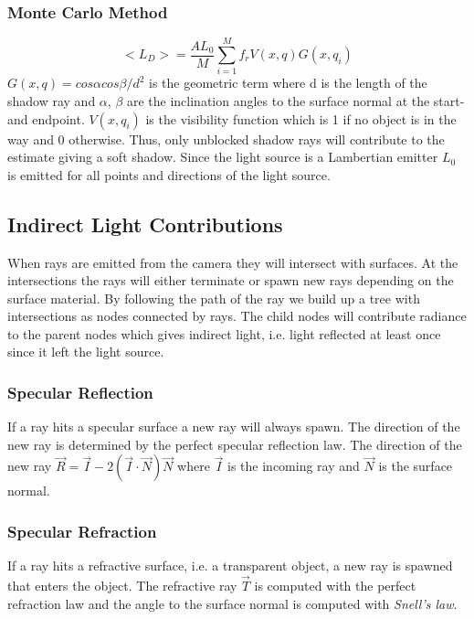 \documentclass[a4paper, twocolumn]{article}
\begin{document}
            \subsubsection{Monte Carlo Method} \label{sec:monte_carlo_method}
            \begin{equation*}
              <L_D> = \frac{AL_0}{M}\sum_{i=1}^{M}{f_r V(x, q) G(x, q_i)}
            \end{equation*}
             $G(x, q) = cos\alpha cos\beta / d^2$ is the geometric term where d is the length of the shadow ray and $\alpha$, $\beta$ are the inclination angles to the surface normal at the start- and endpoint. $V(x, q_i)$ is the visibility function which is 1 if no object is in the way and 0 otherwise. Thus, only unblocked shadow rays will contribute to the estimate giving a soft shadow. Since the light source is a Lambertian emitter $L_0$ is emitted for all points and directions of the light source.
            
            \subsection{Indirect Light Contributions} \label{sec:indirect_light_contributions}
            When rays are emitted from the camera they will intersect with surfaces. At the intersections the rays will either terminate or spawn new rays depending on the surface material. By following the path of the ray we build up a tree with intersections as nodes connected by rays. The child nodes will contribute radiance to the parent nodes which gives indirect light, i.e. light reflected at least once since it left the light source.
            \subsubsection{Specular Reflection} \label{sec:specular_reflection}
            If a ray hits a specular surface a new ray will always spawn. The direction of the new ray is determined by the perfect specular reflection law. The direction of the new ray $\vec{R} = \vec{I} - 2 (\vec{I} \cdot \vec{N}) \vec{N}$ where $\vec{I}$ is the incoming ray and $\vec{N}$ is the surface normal.

            \subsubsection{Specular Refraction} \label{sec:specular_refraction}
            If a ray hits a refractive surface, i.e. a transparent object, a new ray is spawned that enters the object.
            The refractive ray $\vec{T}$ is computed with the perfect refraction law and the angle to the surface normal is computed with \emph{Snell's law}.
\end{document}
